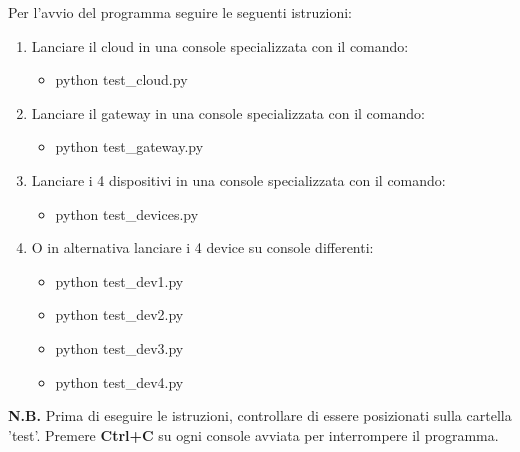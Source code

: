 \documentclass[a4paper,12pt]{report}
\begin{document}
Per l'avvio del programma seguire le seguenti istruzioni:
\begin{enumerate}
    \item Lanciare il cloud in una console specializzata con il comando:
    \begin{itemize}
        \item python test\_cloud.py
    \end{itemize}
    \item Lanciare il gateway in una console specializzata con il comando:
    \begin{itemize}
        \item python test\_gateway.py
    \end{itemize} 
    \item Lanciare i 4 dispositivi in una console specializzata con il comando:
    \begin{itemize}
        \item python test\_devices.py
    \end{itemize} 
    \item O in alternativa lanciare i 4 device su console differenti:
    \begin{itemize}
        \item python test\_dev1.py
        \item python test\_dev2.py
        \item python test\_dev3.py
        \item python test\_dev4.py
    \end{itemize}
\end{enumerate}

\textbf{N.B.} Prima di eseguire le istruzioni, controllare di essere posizionati sulla cartella 'test'.
%
\newline
\newline
Premere \textbf{Ctrl+C} su ogni console avviata per interrompere il programma.
\end{document}
